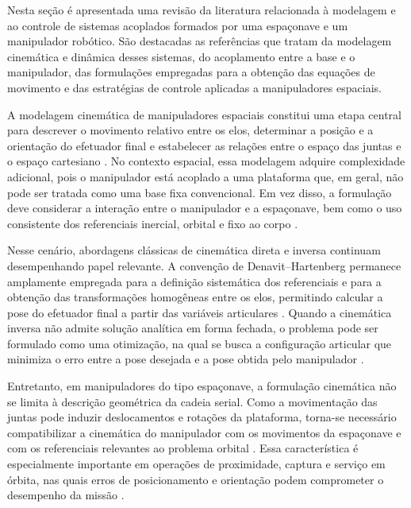 Nesta seção é apresentada uma revisão da literatura relacionada à modelagem e ao controle de sistemas acoplados formados por uma espaçonave e um manipulador robótico. São destacadas as referências que tratam da modelagem cinemática e dinâmica desses sistemas, do acoplamento entre a base e o manipulador, das formulações empregadas para a obtenção das equações de movimento e das estratégias de controle aplicadas a manipuladores espaciais.

A modelagem cinemática de manipuladores espaciais constitui uma etapa central para descrever o movimento relativo entre os elos, determinar a posição e a orientação do efetuador final e estabelecer as relações entre o espaço das juntas e o espaço cartesiano \cite{fonseca2019kinematics}. No contexto espacial, essa modelagem adquire complexidade adicional, pois o manipulador está acoplado a uma plataforma que, em geral, não pode ser tratada como uma base fixa convencional. Em vez disso, a formulação deve considerar a interação entre o manipulador e a espaçonave, bem como o uso consistente dos referenciais inercial, orbital e fixo ao corpo \cite{fonseca2019kinematics,fonseca2016dynamics}.

Nesse cenário, abordagens clássicas de cinemática direta e inversa continuam desempenhando papel relevante. A convenção de Denavit--Hartenberg permanece amplamente empregada para a definição sistemática dos referenciais e para a obtenção das transformações homogêneas entre os elos, permitindo calcular a pose do efetuador final a partir das variáveis articulares \cite{fonseca2019kinematics}. Quando a cinemática inversa não admite solução analítica em forma fechada, o problema pode ser formulado como uma otimização, na qual se busca a configuração articular que minimiza o erro entre a pose desejada e a pose obtida pelo manipulador \cite{santos2022uncertainty,santos2023physics}.

Entretanto, em manipuladores do tipo espaçonave, a formulação cinemática não se limita à descrição geométrica da cadeia serial. Como a movimentação das juntas pode induzir deslocamentos e rotações da plataforma, torna-se necessário compatibilizar a cinemática do manipulador com os movimentos da espaçonave e com os referenciais relevantes ao problema orbital \cite{fonseca2019kinematics,fonseca2016dynamics}. Essa característica é especialmente importante em operações de proximidade, captura e serviço em órbita, nas quais erros de posicionamento e orientação podem comprometer o desempenho da missão \cite{arantes2010far,fonseca2016dynamics}.

